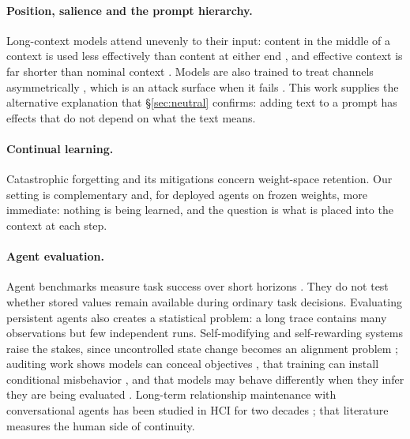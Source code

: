 \documentclass[11pt]{article}
\begin{document}
\paragraph{Position, salience and the prompt hierarchy.} Long-context models attend unevenly to their input: content in the middle of a context is used less effectively than content at either end \citep{liu2024lost}, and effective context is far shorter than nominal context \citep{hsieh2024ruler}. Models are also trained to treat channels asymmetrically \citep{wallace2024hierarchy}, which is an attack surface when it fails \citep{greshake2023injection}. This work supplies the alternative explanation that \S\ref{sec:neutral} confirms: adding text to a prompt has effects that do not depend on what the text means.

\paragraph{Continual learning.} Catastrophic forgetting \citep{french1999catastrophic} and its mitigations \citep{kirkpatrick2017ewc} concern weight-space retention. Our setting is complementary and, for deployed agents on frozen weights, more immediate: nothing is being learned, and the question is what is placed into the context at each step.

\paragraph{Agent evaluation.} Agent benchmarks measure task success over short horizons \citep{liu2024agentbench,zhou2024webarena,mialon2024gaia,jimenez2024swebench}. They do not test whether stored values remain available during ordinary task decisions. Evaluating persistent agents also creates a statistical problem: a long trace contains many observations but few independent runs. Self-modifying and self-rewarding systems \citep{zelikman2024stop,yuan2024selfrewarding} raise the stakes, since uncontrolled state change becomes an alignment problem \citep{bai2022constitutional}; auditing work shows models can conceal objectives \citep{marks2025auditing}, that training can install conditional misbehavior \citep{hubinger2024sleeper}, and that models may behave differently when they infer they are being evaluated \citep{greenblatt2024alignmentfaking,perez2023mwe}. Long-term relationship maintenance with conversational agents has been studied in HCI for two decades \citep{bickmore2005long,skjuve2021companion}; that literature measures the human side of continuity.
\end{document}

